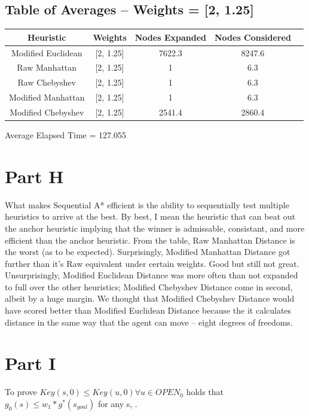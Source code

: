 \documentclass[12pt]{article}
\begin{document}
\subsection{Table of Averages -- Weights = [2, 1.25]}
\begin{tabular}{|c|c|c|c|c|}
\hline
	Heuristic & Weights & Nodes Expanded & Nodes Considered\\
\hline
	Modified Euclidean & [2, 1.25] & 7622.3 & 8247.6\\
\hline
	Raw Manhattan & [2, 1.25] & 1 & 6.3\\
\hline
	Raw Chebyshev & [2, 1.25] & 1 & 6.3\\
\hline
	Modified Manhattan & [2, 1.25] & 1 & 6.3\\
\hline
	Modified Chebyshev & [2, 1.25] & 2541.4 & 2860.4\\
\hline
\end{tabular}
\newline
Average Elapsed Time = 127.055

\section{Part H}
What makes Sequential A* efficient is the ability to sequentially test multiple heuristics to arrive at the best. By best, I mean the heuristic that can beat out the anchor heuristic implying that the winner is admissable, consistant, and more efficient than the anchor heuristic.
\newline
\newline
From the table, Raw Manhattan Distance is the worst (as to be expected). Surprisingly, Modified Manhattan Distance got further than it's Raw equivalent under certain weights. Good but still not great. Unsurprisingly, Modified Euclidean Distance was more often than not expanded to full over the other heuristics; Modified Chebyshev Distance come in second, albeit by a huge margin. We thought that Modified Chebyshev Distance would have scored better than Modified Euclidean Distance because the it calculates distance in the same way that the agent can move -- eight degrees of freedoms.
\newline
\newline

\section{Part I}
To prove \(Key(s,0) \leq Key(u,0) \forall u \in OPEN_0\) holds that \(g_0(s) \leq w_1*g^*(s_{goal})\) for any s, .
\end{document}
